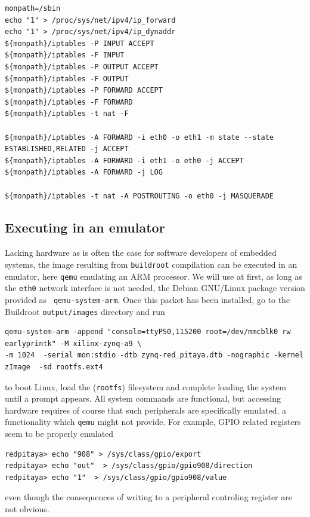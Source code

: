 \documentclass{article}
\begin{document}
{\begin{verbatim}
monpath=/sbin
echo "1" > /proc/sys/net/ipv4/ip_forward
echo "1" > /proc/sys/net/ipv4/ip_dynaddr
${monpath}/iptables -P INPUT ACCEPT
${monpath}/iptables -F INPUT 
${monpath}/iptables -P OUTPUT ACCEPT
${monpath}/iptables -F OUTPUT 
${monpath}/iptables -P FORWARD ACCEPT
${monpath}/iptables -F FORWARD
${monpath}/iptables -t nat -F

${monpath}/iptables -A FORWARD -i eth0 -o eth1 -m state --state ESTABLISHED,RELATED -j ACCEPT
${monpath}/iptables -A FORWARD -i eth1 -o eth0 -j ACCEPT
${monpath}/iptables -A FORWARD -j LOG

${monpath}/iptables -t nat -A POSTROUTING -o eth0 -j MASQUERADE
\end{verbatim}

\subsection{Executing in an emulator}

Lacking hardware as is often the case for software developers of embedded systems, the
image resulting from {\tt buildroot} compilation can be executed in an emulator, here
{\tt qemu} emulating an ARM processor. We will use {\color{red}at first, as long as the {\tt eth0}
network interface is not needed}, the Debian GNU/Linux package version provided as {\tt 
qemu-system-arm}. Once this packet has been installed, go to the Buildroot {\tt output/images} 
directory and run
\begin{verbatim}
qemu-system-arm -append "console=ttyPS0,115200 root=/dev/mmcblk0 rw earlyprintk" -M xilinx-zynq-a9 \
-m 1024  -serial mon:stdio -dtb zynq-red_pitaya.dtb -nographic -kernel zImage  -sd rootfs.ext4
\end{verbatim}
to boot Linux, load the ({\tt rootfs}) filesystem and complete loading the system until a prompt
appears. All system commands are functional, but accessing hardware requires of course that
such peripherals are specifically emulated, a functionality which {\tt qemu} might not provide.
For example, GPIO related registers seem to be properly emulated
\begin{verbatim}
redpitaya> echo "908" > /sys/class/gpio/export 
redpitaya> echo "out"  > /sys/class/gpio/gpio908/direction 
redpitaya> echo "1"  > /sys/class/gpio/gpio908/value
\end{verbatim}
even though the consequences of writing to a peripheral controling register are not obvious.

}
\end{document}
